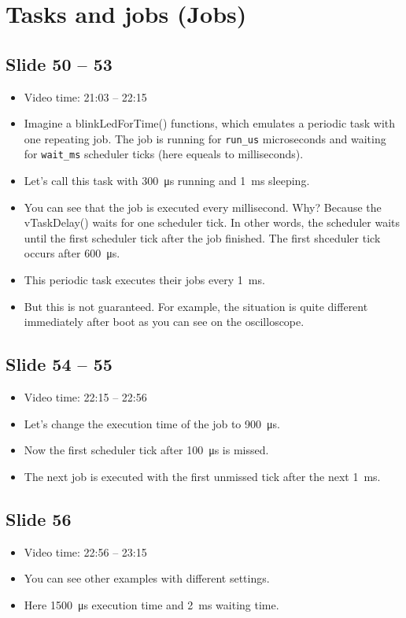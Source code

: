 \documentclass[12pt, a4paper]{article}
\begin{document}
	\section{Tasks and jobs (Jobs)}
	\subsection{Slide 50 -- 53}
	\begin{itemize}
		\item Video time: 21:03 -- 22:15
		\item Imagine a blinkLedForTime() functions, which emulates a periodic task with one repeating job. The job is running for \texttt{run\_us} microseconds and waiting for \texttt{wait\_ms} scheduler ticks (here equeals to milliseconds).
		\item Let's call this task with \SI{300}{\micro \second} running and \SI{1}{ms} sleeping.
		\item You can see that the job is executed every millisecond. Why? Because the vTaskDelay() waits for one scheduler tick. In other words, the scheduler waits until the first scheduler tick after the job finished. The first shceduler tick occurs after \SI{600}{\micro \second}.
		\item This periodic task executes their jobs every \SI{1}{ms}.
		\item But this is not guaranteed. For example, the situation is quite different immediately after boot as you can see on the oscilloscope.
	\end{itemize}

	\subsection{Slide 54 -- 55}
	\begin{itemize}
		\item Video time: 22:15 -- 22:56
		\item Let's change the execution time of the job to \SI{900}{\micro \second}.
		\item Now the first scheduler tick after \SI{100}{\micro \second} is missed.
		\item The next job is executed with the first unmissed tick after the next \SI{1}{ms}.
	\end{itemize}

	\subsection{Slide 56}
	\begin{itemize}
		\item Video time: 22:56 -- 23:15
		\item You can see other examples with different settings.
		\item Here \SI{1500}{\micro \second} execution time and \SI{2}{ms} waiting time.
	\end{itemize}
\end{document}
